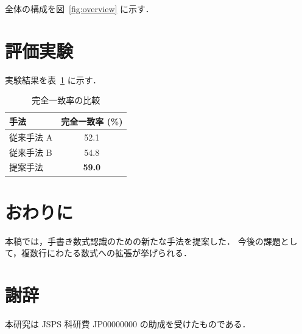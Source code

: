 \documentclass[paper=a4paper,fontsize=10pt,twocolumn]{jlreq}
\begin{document}
全体の構成を図~\ref{fig:overview} に示す．

\section{評価実験}
実験結果を表~\ref{tab:result} に示す．

\begin{table}[tb]
  \centering
  \caption{完全一致率の比較}
  \label{tab:result}
  \begin{tabular}{lc}
    \toprule
    手法 & 完全一致率 (\%) \\
    \midrule
    従来手法 A & 52.1 \\
    従来手法 B & 54.8 \\
    提案手法   & \textbf{59.0} \\
    \bottomrule
  \end{tabular}
\end{table}

\section{おわりに}
本稿では，手書き数式認識のための新たな手法を提案した．
今後の課題として，複数行にわたる数式への拡張が挙げられる．

\section*{謝辞}
本研究は JSPS 科研費 JP00000000 の助成を受けたものである．



\end{document}
